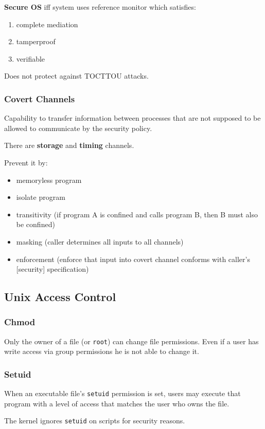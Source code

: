 \textbf{Secure OS} iff system uses reference monitor which satisfies:
\begin{enumerate}
    \item complete mediation
    \item tamperproof
    \item verifiable
\end{enumerate}

Does not protect against TOCTTOU attacks.

\subsubsection{Covert Channels}
Capability to transfer information between processes that are not supposed to be allowed to communicate by the security policy.

There are \textbf{storage} and \textbf{timing} channels.

Prevent it by:
\begin{itemize}
    \item memoryless program
    \item isolate program
    \item transitivity (if program A is confined and calls program B, then B must also be confined)
    \item masking (caller determines all inputs to all channels)
    \item enforcement (enforce that input into covert channel conforms with caller's [security] specification)
\end{itemize}

\subsection{Unix Access Control}
\subsubsection{Chmod}
Only the owner  of a file (or \texttt{root}) can change file permissions. Even if a user has write access via group permissions he is not able to change it.
\subsubsection{Setuid}
When an executable file's \texttt{setuid} permission is set, users may execute that
program with a level of access that matches the user who owns the file.

The kernel ignores \texttt{setuid} on scripts for security reasons.
